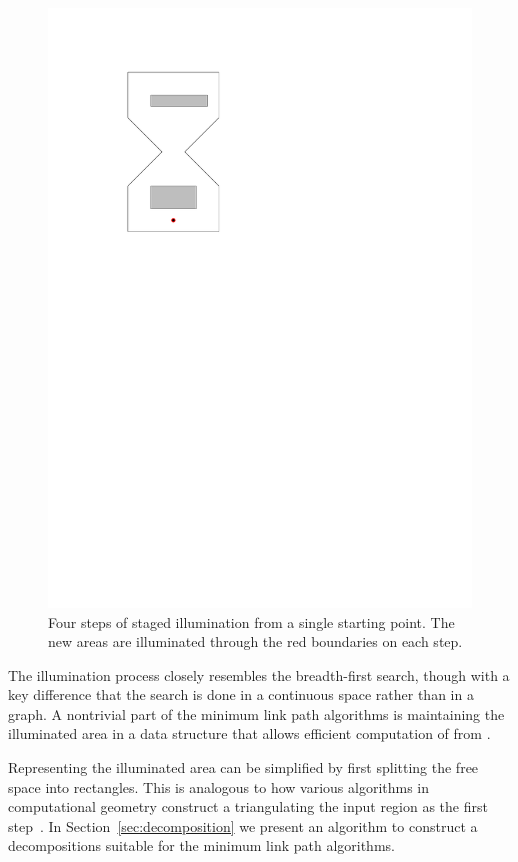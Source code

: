 \documentclass[english,gradu]{tktltiki2018}
\begin{document}
\begin{figure}
	\includegraphics[scale=0.5,page=4]{fig/staged}
	\caption{Four steps of staged illumination from a single starting point. The new areas are illuminated through the red boundaries on each step.}\label{fig:staged}
\end{figure}

The illumination process closely resembles the breadth-first search, though with a key difference that the search is done in a continuous space rather than in a graph.
A nontrivial part of the minimum link path algorithms is maintaining the illuminated area in a data structure that allows efficient computation of  from .

Representing the illuminated area can be simplified by first splitting the free space into rectangles.
This is analogous to how various algorithms in computational geometry construct a triangulating the input region as the first step~\cite{handbook}.
In Section~\ref{sec:decomposition} we present an algorithm to construct a decompositions suitable for the minimum link path algorithms.
\end{document}
